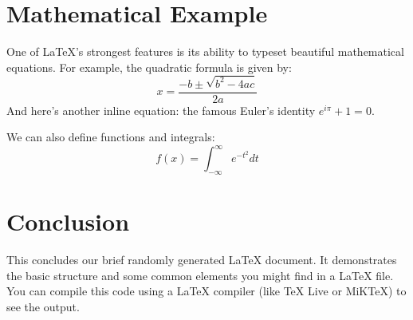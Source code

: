\documentclass{article}
\begin{document}
\section{Mathematical Example}
One of LaTeX's strongest features is its ability to typeset beautiful mathematical equations. For example, the quadratic formula is given by:
\[ x = \frac{-b \pm \sqrt{b^2 - 4ac}}{2a} \]
And here's another inline equation: the famous Euler's identity $e^{i\pi} + 1 = 0$.

We can also define functions and integrals:
\[ f(x) = \int_{-\infty}^{\infty} e^{-t^2} dt \]

\section{Conclusion}
\lipsum[4] %

This concludes our brief randomly generated LaTeX document. It demonstrates the basic structure and some common elements you might find in a LaTeX file. You can compile this code using a LaTeX compiler (like TeX Live or MiKTeX) to see the output.
\end{document}
